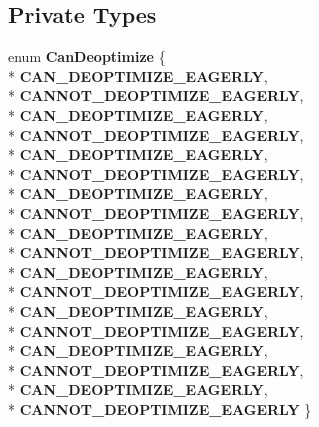 \subsection*{Private Types}
\begin{DoxyCompactItemize}
\item 
enum {\bfseries Can\+Deoptimize} \{ \\*
{\bfseries C\+A\+N\+\_\+\+D\+E\+O\+P\+T\+I\+M\+I\+Z\+E\+\_\+\+E\+A\+G\+E\+R\+LY}, 
\\*
{\bfseries C\+A\+N\+N\+O\+T\+\_\+\+D\+E\+O\+P\+T\+I\+M\+I\+Z\+E\+\_\+\+E\+A\+G\+E\+R\+LY}, 
\\*
{\bfseries C\+A\+N\+\_\+\+D\+E\+O\+P\+T\+I\+M\+I\+Z\+E\+\_\+\+E\+A\+G\+E\+R\+LY}, 
\\*
{\bfseries C\+A\+N\+N\+O\+T\+\_\+\+D\+E\+O\+P\+T\+I\+M\+I\+Z\+E\+\_\+\+E\+A\+G\+E\+R\+LY}, 
\\*
{\bfseries C\+A\+N\+\_\+\+D\+E\+O\+P\+T\+I\+M\+I\+Z\+E\+\_\+\+E\+A\+G\+E\+R\+LY}, 
\\*
{\bfseries C\+A\+N\+N\+O\+T\+\_\+\+D\+E\+O\+P\+T\+I\+M\+I\+Z\+E\+\_\+\+E\+A\+G\+E\+R\+LY}, 
\\*
{\bfseries C\+A\+N\+\_\+\+D\+E\+O\+P\+T\+I\+M\+I\+Z\+E\+\_\+\+E\+A\+G\+E\+R\+LY}, 
\\*
{\bfseries C\+A\+N\+N\+O\+T\+\_\+\+D\+E\+O\+P\+T\+I\+M\+I\+Z\+E\+\_\+\+E\+A\+G\+E\+R\+LY}, 
\\*
{\bfseries C\+A\+N\+\_\+\+D\+E\+O\+P\+T\+I\+M\+I\+Z\+E\+\_\+\+E\+A\+G\+E\+R\+LY}, 
\\*
{\bfseries C\+A\+N\+N\+O\+T\+\_\+\+D\+E\+O\+P\+T\+I\+M\+I\+Z\+E\+\_\+\+E\+A\+G\+E\+R\+LY}, 
\\*
{\bfseries C\+A\+N\+\_\+\+D\+E\+O\+P\+T\+I\+M\+I\+Z\+E\+\_\+\+E\+A\+G\+E\+R\+LY}, 
\\*
{\bfseries C\+A\+N\+N\+O\+T\+\_\+\+D\+E\+O\+P\+T\+I\+M\+I\+Z\+E\+\_\+\+E\+A\+G\+E\+R\+LY}, 
\\*
{\bfseries C\+A\+N\+\_\+\+D\+E\+O\+P\+T\+I\+M\+I\+Z\+E\+\_\+\+E\+A\+G\+E\+R\+LY}, 
\\*
{\bfseries C\+A\+N\+N\+O\+T\+\_\+\+D\+E\+O\+P\+T\+I\+M\+I\+Z\+E\+\_\+\+E\+A\+G\+E\+R\+LY}, 
\\*
{\bfseries C\+A\+N\+\_\+\+D\+E\+O\+P\+T\+I\+M\+I\+Z\+E\+\_\+\+E\+A\+G\+E\+R\+LY}, 
\\*
{\bfseries C\+A\+N\+N\+O\+T\+\_\+\+D\+E\+O\+P\+T\+I\+M\+I\+Z\+E\+\_\+\+E\+A\+G\+E\+R\+LY}, 
\\*
{\bfseries C\+A\+N\+\_\+\+D\+E\+O\+P\+T\+I\+M\+I\+Z\+E\+\_\+\+E\+A\+G\+E\+R\+LY}, 
\\*
{\bfseries C\+A\+N\+N\+O\+T\+\_\+\+D\+E\+O\+P\+T\+I\+M\+I\+Z\+E\+\_\+\+E\+A\+G\+E\+R\+LY}
 \}\hypertarget{classv8_1_1internal_1_1_l_chunk_builder_a9cad53584f2d1fbb8c273561a6e3f2e9}{}\label{classv8_1_1internal_1_1_l_chunk_builder_a9cad53584f2d1fbb8c273561a6e3f2e9}


\end{DoxyCompactItemize}
